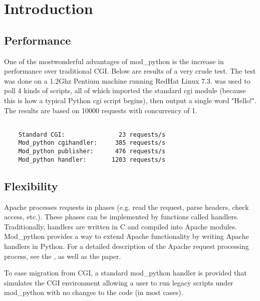 \chapter{Introduction\label{introduction}}

\section{Performance\label{intr-performance}}

One of the mostwonderful advantages of mod_python is the increase in
performance over traditional CGI. Below are results of a very crude
test. The test was done on a 1.2Ghz Pentium machine running RedHat
Linux
7.3. 
was used to poll 4 kinds of scripts, all of which imported the
standard cgi module (because this is how a typical Python cgi script
begins), then output a single word "Hello!". The results are based on
10000 requests with concurrency of 1.

\begin{verbatim}

    Standard CGI:               23 requests/s
    Mod_python cgihandler:     385 requests/s
    Mod_python publisher:      476 requests/s
    Mod_python handler:       1203 requests/s

\end{verbatim}         

\section{Flexibility\label{intr-flexibility}}

Apache processes requests in phases (e.g. read the request, parse
headers, check access, etc.). These phases can be implemented by
functions called handlers. Traditionally, handlers are written in C
and compiled into Apache modules. Mod_python provides a way to extend
Apache functionality by writing Apache handlers in Python. For a
detailed description of the Apache request processing process, see the
, as well
as the  paper. 

To ease migration from CGI, a standard mod_python handler is provided
that simulates the CGI environment allowing a user to run legacy scripts
under mod_python with no changes to the code (in most cases).
 
\begin{seealso}
\end{seealso}

